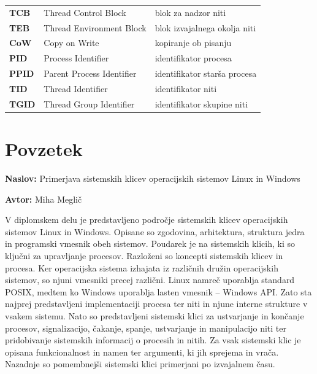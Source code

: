 \documentclass[a4paper,12pt,openright]{book}
\newcommand{\ttitle}{Primerjava sistemskih klicev operacijskih sistemov Linux in Windows}
\newcommand{\tauthor}{Miha Meglič}
\newcommand{\clearemptydoublepage}{\newpage{\pagestyle{empty}\cleardoublepage}}
\begin{document}
\begin{tabular}{p{}|p{}|p{}}
{\bf TCB}     & Thread Control Block                & blok za nadzor niti                        \\
{\bf TEB}     & Thread Environment Block            & blok izvajalnega okolja niti               \\
{\bf CoW}     & Copy on Write                       & kopiranje ob pisanju                       \\
{\bf PID}     & Process Identifier                  & identifikator procesa                      \\
{\bf PPID}    & Parent Process Identifier           & identifikator starša procesa               \\
{\bf TID}     & Thread Identifier                   & identifikator niti                         \\
{\bf TGID}    & Thread Group Identifier             & identifikator skupine niti                 \\
\end{tabular}


\clearemptydoublepage

\chapter*{Povzetek}

\noindent\textbf{Naslov:} \ttitle
\bigskip

\noindent\textbf{Avtor:} \tauthor
\bigskip

\noindent V diplomskem delu je predstavljeno področje sistemskih klicev operacijskih sistemov Linux in Windows.
Opisane so zgodovina, arhitektura, struktura jedra in programski vmesnik obeh sistemov.
Poudarek je na sistemskih klicih, ki so ključni za upravljanje procesov.
Razloženi so koncepti sistemskih klicev in procesa.
Ker operacijska sistema izhajata iz različnih družin operacijskih sistemov, so njuni vmesniki precej različni.
Linux namreč uporablja standard POSIX, medtem ko Windows uporablja lasten vmesnik -- Windows API.
Zato sta najprej predstavljeni implementaciji procesa ter niti in njune interne strukture v vsakem sistemu.
Nato so predstavljeni sistemski klici za ustvarjanje in končanje procesov, signalizacijo, čakanje, spanje, ustvarjanje in manipulacijo niti ter pridobivanje sistemskih informacij o procesih in nitih.
Za vsak sistemski klic je opisana funkcionalnost in namen ter argumenti, ki jih sprejema in vrača.
Nazadnje so pomembnejši sistemski klici primerjani po izvajalnem času.
\end{document}
